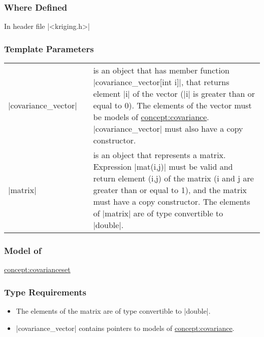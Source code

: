 \documentclass[12pt,twoside]{report}
\begin{document}
\htmlrule[CLEAR=all]  \subsubsection*{Where Defined}
In header file |<kriging.h>|

\htmlrule[CLEAR=all]  \subsubsection*{Template Parameters}
\begin{tabular}[!h]{l l p{10cm}}
|covariance_vector| & & is an object that has member function |covariance_vector[int i]|, that returns element |i| of the vector (|i| is greater than or equal to 0). The elements of the vector must be models of \hyperref{Covariance}{Covariance}{}{concept:covariance}. |covariance_vector| must also have a copy constructor.\\
|matrix| & & is an object that represents a matrix. Expression |mat(i,j)| must be valid and return element (i,j) of the matrix (i and j are greater than or equal to 1), and the matrix must have a copy constructor. The elements of |matrix| are of type convertible to |double|.\\
\end{tabular}


\htmlrule[CLEAR=all]  \subsubsection*{Model of}
\hyperref{Covariance Set}{Covariance Set}{}{concept:covarianceset}

\htmlrule[CLEAR=all]  \subsubsection*{Type Requirements}
\begin{itemize}
\item The elements of the matrix are of type convertible to |double|.

\item |covariance_vector| contains pointers to models of \hyperref{Covariance}{Covariance}{}{concept:covariance}.
\end{itemize}
\end{document}
